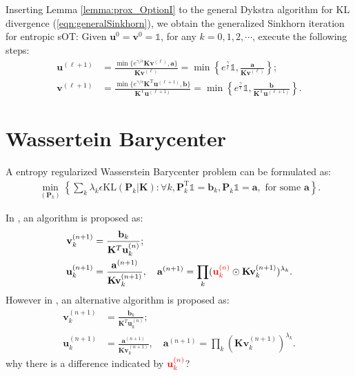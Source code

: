 \documentclass[11pt]{book}
\begin{document}
Inserting Lemma \ref{lemma:prox_OptionI} to the general Dykstra algorithm for KL divergence (\ref{eqn:generalSinkhorn}), we obtain the generalized Sinkhorn iteration for entropic sOT: Given $\textbf{u}^0 = \textbf{v}^0 = \mathbb{1}$, for any $k=0,1,2,\cdots$, execute the following steps:
\begin{align}
\textbf{u}^{(\ell+1)} &=  \frac{\min\{ e^{\gamma/\epsilon}\textbf{K}\textbf{v}^{(\ell)}, \textbf{a}\}}{\textbf{K} \textbf{v}^{(\ell)}} = \min \left\{ e^{\frac{\gamma}{\epsilon}}\mathbb{1}, \frac{\textbf{a}}{\textbf{K}\textbf{v}^{(\ell)}} \right\}; \\
\textbf{v}^{(\ell+1)} &=  \frac{\min\{ e^{\gamma/\epsilon}\textbf{K}^{\mathrm{T}}\textbf{u}^{(\ell+1)}, \textbf{b}\}}{\textbf{K}^{\mathrm{T}} \textbf{u}^{(\ell+1)}} = \min \left\{ e^{\frac{\gamma}{\epsilon}}\mathbb{1}, \frac{\textbf{b}}{\textbf{K}^{\mathrm{T}}\textbf{u}^{(\ell+1)}} \right\}.
\end{align}







\section{Wassertein Barycenter}


A entropy regularized Wasserstein Barycenter problem can be formulated as:
\begin{align}
\min_{(\mathbf{P}_k)} \left\{ \sum_k \lambda_k \epsilon \mathrm{KL}(\mathbf{P}_k|\mathbf{K}): \forall k, \mathbf{P}_k^{\mathrm{T}}\mathbb{1} = \mathbf{b}_k, \mathbf{P}_k \mathbb{1} = \mathbf{a}, \text{ for some } \mathbf{a}\right\}.
\end{align}

In \cite{benamou2015augmented}, an algorithm is proposed as:
\begin{align}
\mathbf{v}_k^{(n+1)} &= \frac{\mathbf{b}_k}{\mathbf{K}^T\mathbf{u}_k^{(n)}}; \\
\mathbf{u}_k^{(n+1)} &= \frac{\mathbf{a}^{(n+1)}}{\mathbf{K}\mathbf{v}_k^{(n+1)}}, \quad \mathbf{a}^{(n+1)} = \prod_k ({\color{red}\mathbf{u}_k^{(n)}}\odot\mathbf{K}\mathbf{v}_k^{(n+1)})^{\lambda_k}.  \label{eqn:Benamou02}
\end{align}
However in \cite{peyre2019computational}, an alternative algorithm is proposed as:
\begin{align}
\mathbf{v}_k^{(n+1)} &= \frac{\mathbf{b}_k}{\mathbf{K}^T\mathbf{u}_k^{(n)}}; \label{eqn:Cuturi01}\\
\mathbf{u}_k^{(n+1)} &= \frac{\mathbf{a}^{(n+1)}}{\mathbf{K}\mathbf{v}_k^{(n+1)}}, \quad \mathbf{a}^{(n+1)} = \prod_k (\mathbf{K}\mathbf{v}_k^{(n+1)})^{\lambda_k}.\label{eqn:Cuturi02}
\end{align}
why there is a difference indicated by ${\color{red}\mathbf{u}_k^{(n)}}$?
\end{document}
